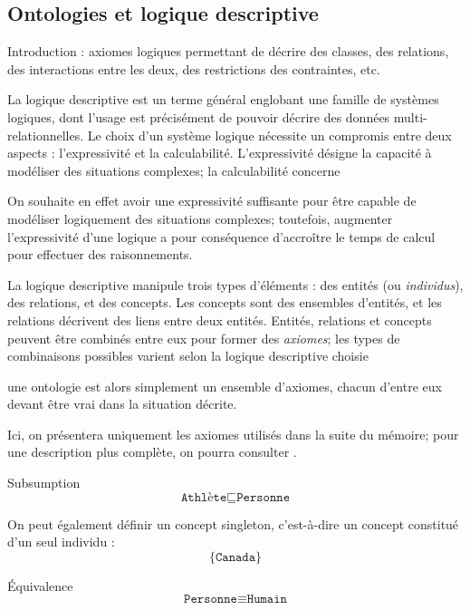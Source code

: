 \subsection{Ontologies et logique descriptive}

Introduction : axiomes logiques permettant de décrire des classes, des relations, des interactions entre les deux, des restrictions des contraintes, etc.


La logique descriptive est un terme général englobant une famille de systèmes logiques, dont l'usage est précisément de pouvoir décrire des données multi-relationnelles. 
Le choix d'un système logique nécessite un compromis entre deux aspects : l'expressivité et la calculabilité. L'expressivité désigne la capacité à modéliser des situations complexes; la calculabilité concerne 

On souhaite en effet avoir une expressivité suffisante pour être capable de modéliser logiquement des situations complexes; toutefois, augmenter l'expressivité d'une logique a pour conséquence d'accroître le temps de calcul pour effectuer des raisonnements.


La logique descriptive manipule trois types d'éléments : des entités (ou \textit{individus}), des relations, et des concepts. Les concepts sont des ensembles d'entités, et les relations décrivent des liens entre deux entités. Entités, relations et concepts peuvent être combinés entre eux pour former des \textit{axiomes}; les types de combinaisons possibles varient selon la logique descriptive choisie

une ontologie est alors simplement un ensemble d'axiomes, chacun d'entre eux devant être vrai dans la situation décrite.

Ici, on présentera uniquement les axiomes utilisés dans la suite du mémoire; pour une description plus complète, on pourra consulter \cite{krotzsch2013description}. 

Subsumption 
\begin{equation}
    \texttt{Athlète} \sqsubseteq \texttt{Personne}
\end{equation}


On peut également définir un concept singleton, c'est-à-dire un concept constitué d'un seul individu :
\begin{equation}
    \{ \texttt{Canada} \}
\end{equation}

Équivalence
\begin{equation}
    \texttt{Personne} \equiv \texttt{Humain}
\end{equation}

